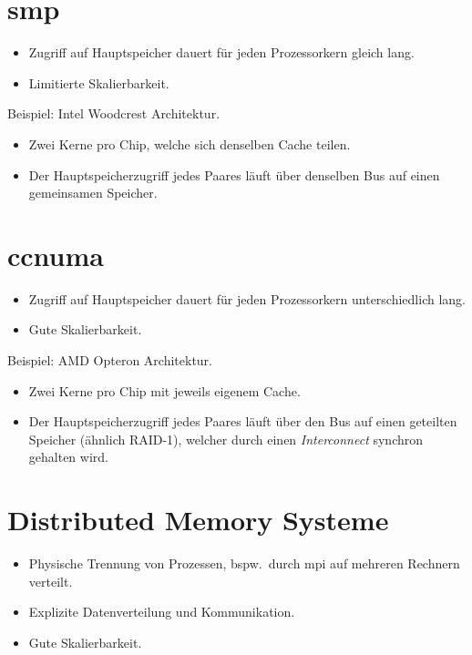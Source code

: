 \section[SMP]{\gls{smp}}

\begin{itemize}
  \item Zugriff auf Hauptspeicher dauert für jeden Prozessorkern gleich lang.
  \item Limitierte Skalierbarkeit.
\end{itemize}
Beispiel: Intel Woodcrest Architektur.
\begin{itemize}
  \item Zwei Kerne pro Chip, welche sich denselben Cache teilen.
  \item Der Hauptspeicherzugriff jedes Paares läuft über denselben Bus auf einen gemeinsamen Speicher.
\end{itemize}

\section[ccNUMA]{\gls{ccnuma}}

\begin{itemize}
  \item Zugriff auf Hauptspeicher dauert für jeden Prozessorkern unterschiedlich lang.
  \item Gute Skalierbarkeit.
\end{itemize}
Beispiel: AMD Opteron Architektur.
\begin{itemize}
  \item Zwei Kerne pro Chip mit jeweils eigenem Cache.
  \item Der Hauptspeicherzugriff jedes Paares läuft über den Bus auf einen geteilten Speicher (ähnlich RAID-1), welcher durch einen \emph{Interconnect} synchron gehalten wird.
\end{itemize}

\section{Distributed Memory Systeme}

\begin{itemize}
  \item Physische Trennung von Prozessen, bspw.~durch \gls{mpi} auf mehreren Rechnern verteilt.
  \item Explizite Datenverteilung und Kommunikation.
  \item Gute Skalierbarkeit.
\end{itemize}

